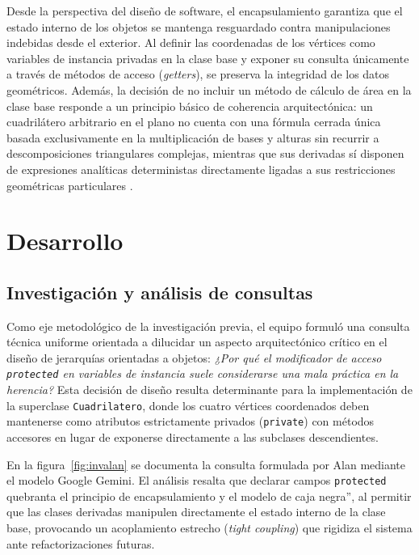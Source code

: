 \documentclass[letterpaper,12pt,oneside]{article}
\numberwithin{figure}{section}
\begin{document}
Desde la perspectiva del dise\~no de software, el encapsulamiento garantiza que el estado interno de los objetos se mantenga resguardado contra manipulaciones indebidas desde el exterior. Al definir las coordenadas de los v\'ertices como variables de instancia privadas en la clase base y exponer su consulta \'unicamente a trav\'es de m\'etodos de acceso (\textit{getters}), se preserva la integridad de los datos geom\'etricos. Adem\'as, la decisi\'on de no incluir un m\'etodo de c\'alculo de \'area en la clase base responde a un principio b\'asico de coherencia arquitect\'onica: un cuadril\'atero arbitrario en el plano no cuenta con una f\'ormula cerrada \'unica basada exclusivamente en la multiplicaci\'on de bases y alturas sin recurrir a descomposiciones triangulares complejas, mientras que sus derivadas s\'i disponen de expresiones anal\'iticas deterministas directamente ligadas a sus restricciones geom\'etricas particulares \cite{deitel2018}.

\clearpage

\section{Desarrollo}

\subsection{Investigaci\'on y an\'alisis de consultas}

Como eje metodol\'ogico de la investigaci\'on previa, el equipo formul\'o una consulta t\'ecnica uniforme orientada a dilucidar un aspecto arquitect\'onico cr\'itico en el dise\~no de jerarqu\'ias orientadas a objetos: \textit{¿Por qu\'e el modificador de acceso \texttt{protected} en variables de instancia suele considerarse una mala pr\'actica en la herencia?} Esta decisi\'on de dise\~no resulta determinante para la implementaci\'on de la superclase \texttt{Cuadrilatero}, donde los cuatro v\'ertices coordenados deben mantenerse como atributos estrictamente privados (\texttt{private}) con m\'etodos accesores en lugar de exponerse directamente a las subclases descendientes.

En la figura~\ref{fig:invalan} se documenta la consulta formulada por Alan mediante el modelo Google Gemini. El an\'alisis resalta que declarar campos \texttt{protected} quebranta el principio de encapsulamiento y el modelo de caja negra'', al permitir que las clases derivadas manipulen directamente el estado interno de la clase base, provocando un acoplamiento estrecho (\textit{tight coupling}) que rigidiza el sistema ante refactorizaciones futuras.
\end{document}
